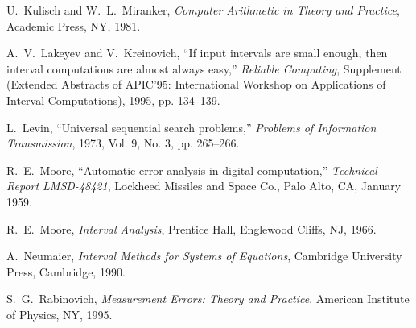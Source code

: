 \begin{thereferences}{99}
U.~Kulisch and W.~L.~Miranker,
 {\it Computer Arithmetic in Theory and Practice},
 Academic Press, NY, 1981.

A.~V.~Lakeyev and V.~Kreinovich,
 ``If input intervals are small enough, then interval computations are almost
 always easy,''
 {\it Reliable Computing},
 Supplement (Extended Abstracts of APIC'95: International Workshop on 
 Applications of Interval Computations),
 1995, pp. 134--139.

L.~Levin,
 ``Universal sequential search problems,''
 {\it Problems of Information Transmission},
 1973, Vol. 9, No. 3, pp. 265--266.

R.~E.~Moore,
 ``Automatic error analysis in digital computation,''
 {\it Technical Report LMSD-48421},
 Lockheed Missiles and Space Co., Palo Alto, CA, January 1959.

R.~E.~Moore,
 {\it Interval Analysis},
 Prentice Hall, Englewood Cliffs, NJ, 1966.

A.~Neumaier,
 {\it Interval Methods for Systems of Equations},
 Cambridge University Press, Cambridge, 1990.

S.~G.~Rabinovich,
 {\it Measurement Errors: Theory and Practice},
 American Institute of Physics, NY, 1995.

\end{thereferences}
